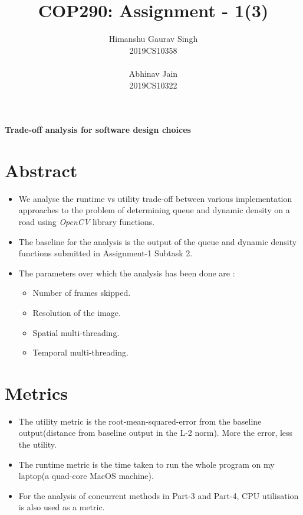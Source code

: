 \documentclass[a4paper]{article}
\title{COP290: Assignment - 1(3)}
\author{
Himanshu Gaurav Singh \\ 
2019CS10358 
\\ \\
Abhinav Jain \\
2019CS10322 \\  }
\begin{document}
\maketitle
\begin{center} \textbf{ \Large Trade-off analysis for software design choices} 
\end{center}
\section*{Abstract}
\begin{itemize}
\item We analyse the runtime vs utility trade-off between various implementation approaches to the problem of determining queue and dynamic density on a road using \textit{OpenCV} library functions.
\item The baseline for the analysis is the output of the queue and dynamic density functions submitted in Assignment-1 Subtask 2. 
\item The parameters over which the analysis has been done are : 
\begin{itemize}
    \item Number of frames skipped.
    \item Resolution of the image.
    \item Spatial multi-threading.
    \item Temporal multi-threading.
\end{itemize} 
\end{itemize}    
\section *{Metrics}
\begin{itemize}
    \item The utility metric is the root-mean-squared-error from the baseline output(distance from baseline output in the L-2 norm). More the error, less the utility. 
    \item The runtime metric is the time taken to run the whole program on my laptop(a quad-core MacOS machine).
    \item For the analysis of concurrent methods in Part-3 and Part-4, CPU utilisation is also used as a metric.
\end{itemize}
\end{document}
